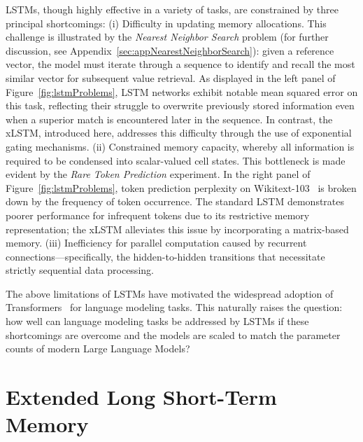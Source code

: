 LSTMs, though highly effective in a variety of tasks, are constrained by three principal shortcomings: (i) Difficulty in updating memory allocations. This challenge is illustrated by the 
{\it Nearest Neighbor Search} problem (for further discussion, see Appendix~\ref{sec:appNearestNeighborSearch}): given a reference vector, the model must iterate through a sequence to identify and recall the most similar vector for subsequent value retrieval. As displayed in the left panel of Figure~\ref{fig:lstmProblems}, LSTM networks exhibit notable mean squared error on this task, reflecting their struggle to overwrite previously stored information even when a superior match is encountered later in the sequence. In contrast, the xLSTM, introduced here, addresses this difficulty through the use of exponential gating mechanisms. (ii) Constrained memory capacity, whereby all information is required to be condensed into scalar-valued cell states. This bottleneck is made evident by the {\it Rare Token Prediction} experiment. In the right panel of Figure~\ref{fig:lstmProblems}, token prediction perplexity on Wikitext-103~\citep{Merity:17} is broken down by the frequency of token occurrence. The standard LSTM demonstrates poorer performance for infrequent tokens due to its restrictive memory representation; the xLSTM alleviates this issue by incorporating a matrix-based memory. (iii) Inefficiency for parallel computation caused by recurrent connections—specifically, the hidden-to-hidden transitions that necessitate strictly sequential data processing.

The above limitations of LSTMs have motivated the widespread adoption of Transformers~\citep{Vaswani:17} for language modeling tasks. This naturally raises the question: how well can language modeling tasks be addressed by LSTMs if these shortcomings are overcome and the models are scaled to match the parameter counts of modern Large Language Models?

\section{Extended Long Short-Term Memory}
\label{sec:xLSTM}

